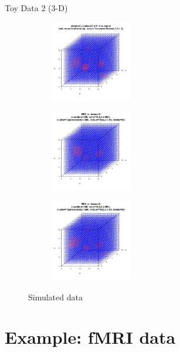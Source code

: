 \documentclass[10pt,mathserif]{beamer}
\begin{document}
\begin{frame}{Toy Data 2 (3-D)}
\begin{figure}[t!]
    \centering
    \begin{subfigure}[t]{0.3\textwidth}
        \centering
        \includegraphics[height=1.4in, width=1.4in]{../simulation_data3.jpg}
        \caption{}
    \end{subfigure}%
    \begin{subfigure}[t]{0.3\textwidth}
        \centering
        \includegraphics[height=1.4in, width=1.4in]{../datase3_poi50.jpg}
        \caption{}
    \end{subfigure}%
        \begin{subfigure}[t]{0.3\textwidth}
        \centering
        \includegraphics[height=1.4in, width=1.4in]{../best3.jpg}
        \caption{}
    \end{subfigure}
    \caption{Simulated data}
\end{figure}
\end{frame}

\section{Example: fMRI data}
\end{document}
